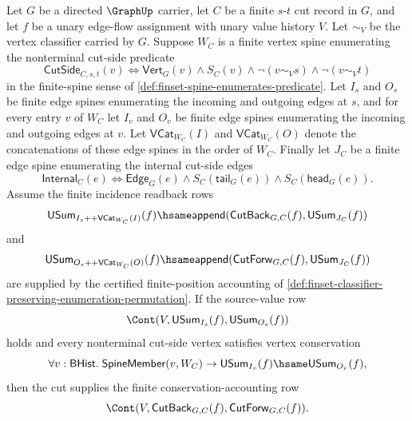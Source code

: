 \begin{theorem}
\label{thm:networkflow-cut-accounting-from-vertex-conservation}
Let $G$ be a directed $\GraphUp$ carrier, let $C$ be a finite $s$-$t$ cut record in $G$, and let $f$ be a unary edge-flow assignment with unary value history $V$. Let $\sim_V$ be the vertex classifier carried by $G$. Suppose $W_C$ is a finite vertex spine enumerating the nonterminal cut-side predicate
$$
\mathsf{CutSide}_{C,s,t}(v)
\Longleftrightarrow
\mathsf{Vert}_G(v)\land S_C(v)\land \neg(v\sim_V s)\land \neg(v\sim_V t)
$$
in the finite-spine sense of \autoref{def:finset-spine-enumerates-predicate}. Let $I_s$ and $O_s$ be finite edge spines enumerating the incoming and outgoing edges at $s$, and for every entry $v$ of $W_C$ let $I_v$ and $O_v$ be finite edge spines enumerating the incoming and outgoing edges at $v$. Let $\mathsf{VCat}_{W_C}(I)$ and $\mathsf{VCat}_{W_C}(O)$ denote the concatenations of these edge spines in the order of $W_C$. Finally let $J_C$ be a finite edge spine enumerating the internal cut-side edges
$$
\mathsf{Internal}_C(e)
\Longleftrightarrow
\mathsf{Edge}_G(e)\land S_C(\mathsf{tail}_G(e))\land S_C(\mathsf{head}_G(e)).
$$
Assume the finite incidence readback rows
$$
\mathsf{USum}_{I_s{++}\mathsf{VCat}_{W_C}(I)}(f)
\hsame
\mathsf{append}(\mathsf{CutBack}_{G,C}(f),\mathsf{USum}_{J_C}(f))
$$
and
$$
\mathsf{USum}_{O_s{++}\mathsf{VCat}_{W_C}(O)}(f)
\hsame
\mathsf{append}(\mathsf{CutForw}_{G,C}(f),\mathsf{USum}_{J_C}(f))
$$
are supplied by the certified finite-position accounting of \autoref{def:finset-classifier-preserving-enumeration-permutation}. If the source-value row
$$
\Cont(V,\mathsf{USum}_{I_s}(f),\mathsf{USum}_{O_s}(f))
$$
holds and every nonterminal cut-side vertex satisfies vertex conservation
$$
\forall v:\mathsf{BHist}.\;
\mathsf{SpineMember}(v,W_C)
\to
\mathsf{USum}_{I_v}(f)\hsame\mathsf{USum}_{O_v}(f),
$$
then the cut supplies the finite conservation-accounting row
$$
\Cont(V,\mathsf{CutBack}_{G,C}(f),\mathsf{CutForw}_{G,C}(f)).
$$
\end{theorem}
